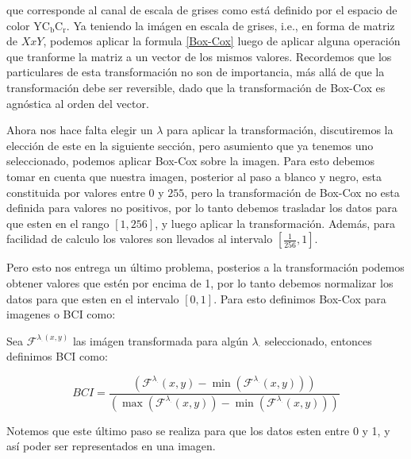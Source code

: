     que corresponde al canal de escala de grises como est\'a definido por el espacio de color $\mathrm{YC}_{\mathrm{b}} \mathrm{C}_{\mathrm{r}}$. Ya teniendo la im\'agen en escala de grises, i.e., en forma de matriz de $XxY$, podemos aplicar la formula \ref{Box-Cox} luego de aplicar alguna operaci\'on que tranforme la matriz a un vector de los mismos valores. Recordemos que los particulares de esta transformaci\'on no son de importancia, m\'as all\'a de que la transformaci\'on debe ser reversible, dado que la transformaci\'on de Box-Cox es agn\'ostica al orden del vector.

    Ahora nos hace falta elegir un $\lambda$ para aplicar la transformaci\'on, discutiremos la elecci\'on de este en la siguiente secci\'on, pero asumiento que ya tenemos uno seleccionado, podemos aplicar Box-Cox sobre la imagen. Para esto debemos tomar en cuenta que nuestra imagen, posterior al paso a blanco y negro, esta constituida por valores entre $0$ y $255$, pero la transformaci\'on de Box-Cox no esta definida para valores no positivos, por lo tanto debemos trasladar los datos para que esten en el rango $[1,256]$, y luego aplicar la transformaci\'on. Adem\'as, para facilidad de calculo los valores son llevados al intervalo $[\frac{1}{256},1]$.

    Pero esto nos entrega un \'ultimo problema, posterios a la transformaci\'on podemos obtener valores que est\'en por encima de 1, por lo tanto debemos normalizar los datos para que esten en el intervalo $[0,1]$. Para esto definimos Box-Cox para imagenes o BCI como:

    \begin{defn}

        Sea $\mathcal{F}^{\lambda_{\cdot}(x, y)}$ las im\'agen transformada para alg\'un $\lambda_\cdot$ seleccionado, entonces definimos BCI como:

    \begin{equation}
        BCI = \frac{\left(\mathcal{F}^{\lambda_{\cdot}}(x, y) - \min\left(\mathcal{F}^{\lambda_{\cdot}}(x, y)\right)\right)}{\left(\max\left(\mathcal{F}^{\lambda_{\cdot}}(x, y)\right) - \min\left(\mathcal{F}^{\lambda_{\cdot}}(x, y)\right)\right)}
    \end{equation}
        
        
    \end{defn}

    Notemos que este \'ultimo paso se realiza para que los datos esten entre 0 y 1, y as\'i poder ser representados en una imagen.
    

